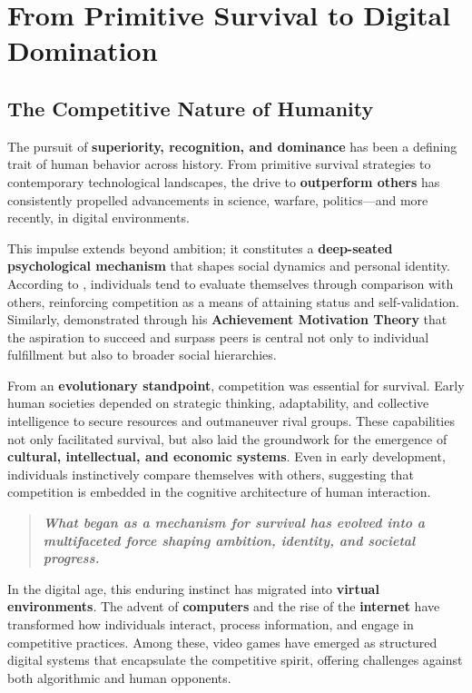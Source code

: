 \chapter{From Primitive Survival to Digital Domination}

\section{The Competitive Nature of Humanity}

The pursuit of \textbf{superiority, recognition, and dominance} has been a defining trait of human behavior across history. From primitive survival strategies to contemporary technological landscapes, the drive to \textbf{outperform others} has consistently propelled advancements in science, warfare, politics—and more recently, in digital environments.

This impulse extends beyond ambition; it constitutes a \textbf{deep-seated psychological mechanism} that shapes social dynamics and personal identity. According to \textcite{festinger1954theory}, individuals tend to evaluate themselves through comparison with others, reinforcing competition as a means of attaining status and self-validation. Similarly, \textcite{mcclelland1961achievement} demonstrated through his \textbf{Achievement Motivation Theory} that the aspiration to succeed and surpass peers is central not only to individual fulfillment but also to broader social hierarchies.

From an \textbf{evolutionary standpoint}, competition was essential for survival. Early human societies depended on strategic thinking, adaptability, and collective intelligence to secure resources and outmaneuver rival groups. These capabilities not only facilitated survival, but also laid the groundwork for the emergence of \textbf{cultural, intellectual, and economic systems}. Even in early development, individuals instinctively compare themselves with others, suggesting that competition is embedded in the cognitive architecture of human interaction.

\begin{quote}
\textbf{\textit{What began as a mechanism for survival has evolved into a multifaceted force shaping ambition, identity, and societal progress.}}
\end{quote}

In the digital age, this enduring instinct has migrated into \textbf{virtual environments}. The advent of \textbf{computers} and the rise of the \textbf{internet} have transformed how individuals interact, process information, and engage in competitive practices. Among these, video games have emerged as structured digital systems that encapsulate the competitive spirit, offering challenges against both algorithmic and human opponents.


